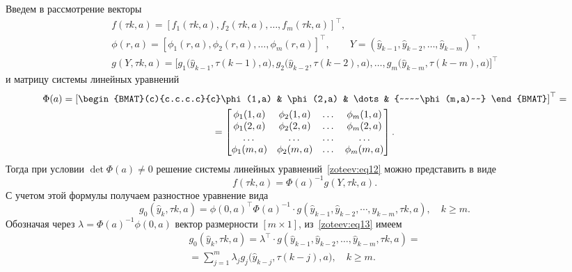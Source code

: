 Введем в рассмотрение векторы
\begin{gather}
f(\tau k,a)=[f_1(\tau k,a),f_2(\tau k,a), \dots, f_m(\tau k,a)]^{\top},
\\
\phi(r,a)=[\phi_1(r,a),\phi_2(r,a),\dots, \phi_m(r,a)]^{\top}, \qquad Y=(\hat{y}_{k-1},\hat{y}_{k-2},\dots,\hat{y}_{k-m})^{\top},
\\
g(Y,\tau k,a){=}\bigl[
g_1\bigl(\hat{y}_{k-1},\tau(k{-}1),a\bigr),
g_2\bigl(\hat{y}_{k-2},\tau(k{-}2),a\bigr),\dots,
g_m\bigl(\hat{y}_{k-m},\tau(k{-}m),a\bigr) \bigr]^{\top}
\end{gather}
и матрицу системы линейных уравнений
\begin{multline}
\Phi(a)=\left[\begin{BMAT}(c){c.c.c.c}{c}\phi(1,a) & \phi(2,a) & \dots & {~~~~\phi(m,a)~~} \end{BMAT}\right]^{\top}=
\\
=\begin{bmatrix}
\phi_1(1,a) & \phi_2(1,a) & \dots & \phi_m(1,a) \\
\phi_1(2,a) & \phi_2(2,a) & \dots & \phi_m(2,a) \\
\dots & \dots & \dots & \dots \\
\phi_1(m,a) & \phi_2(m,a) & \dots & \phi_m(m,a) 
\end{bmatrix}.
\end{multline}
Тогда при условии $\det \Phi(a)\neq 0$ решение системы линейных уравнений~\eqref{zoteev:eq12} можно представить в виде 
$$
f(\tau k,a)=\Phi(a)^{-1}g(Y,\tau k,a).
$$ 
С учетом этой формулы получаем разностное уравнение вида 
\begin{equation}
g_0(\hat{y}_k,\tau k,a)=\phi(0,a)^{\top}\Phi(a)^{-1}\cdot g(\hat{y}_{k-1},\hat{y}_{k-2},\cdots,\hat{y}_{k-m},\tau k,a), \quad k \geq m.
\label{zoteev:eq13}
\end{equation}
Обозначая через $\lambda=\Phi(a)^{-1}\phi(0,a)$ вектор размерности $[m {\times} 1]$, из~\eqref{zoteev:eq13} имеем
\begin{multline}
g_0(\hat{y}_k,\tau k,a)=\lambda^{\top}\cdot g(\hat{y}_{k-1},\hat{y}_{k-2},\dots,\hat{y}_{k-m},\tau k,a)=
\\
=\sum_{j=1}^{m} \lambda_j g_j \bigl(\hat{y}_{k-j},\tau (k-j),a\bigr), \quad  k \geq m.
\end{multline}

